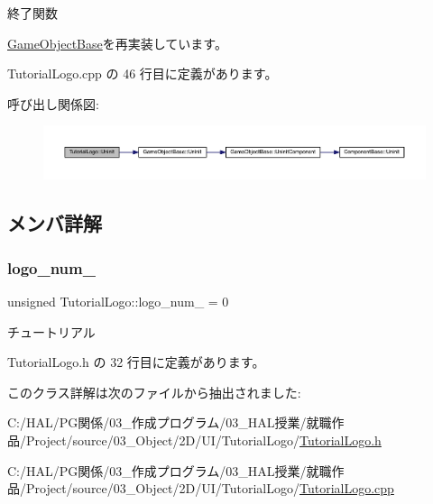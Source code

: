 終了関数 



\mbox{\hyperlink{class_game_object_base_a97e1bc277d7b1c0156d4735de29a022c}{Game\+Object\+Base}}を再実装しています。



 Tutorial\+Logo.\+cpp の 46 行目に定義があります。

呼び出し関係図\+:\nopagebreak
\begin{figure}[H]
\begin{center}
\leavevmode
\includegraphics[width=350pt]{class_tutorial_logo_a8e1f1dba47dadf7d1bb40f616324ffb5_cgraph}
\end{center}
\end{figure}


\subsection{メンバ詳解}
\mbox{\label{class_tutorial_logo_a8027b42e33a036e88277c4cd17fabdaa}} 
\subsubsection{\texorpdfstring{logo\+\_\+num\+\_\+}{logo\_num\_}}
{\footnotesize\ttfamily unsigned Tutorial\+Logo\+::logo\+\_\+num\+\_\+ = 0\hspace{0.3cm}{\ttfamily [private]}}



チュートリアル 



 Tutorial\+Logo.\+h の 32 行目に定義があります。



このクラス詳解は次のファイルから抽出されました\+:\begin{DoxyCompactItemize}
\item 
C\+:/\+H\+A\+L/\+P\+G関係/03\+\_\+作成プログラム/03\+\_\+\+H\+A\+L授業/就職作品/\+Project/source/03\+\_\+\+Object/2\+D/\+U\+I/\+Tutorial\+Logo/\mbox{\hyperlink{_tutorial_logo_8h}{Tutorial\+Logo.\+h}}\item 
C\+:/\+H\+A\+L/\+P\+G関係/03\+\_\+作成プログラム/03\+\_\+\+H\+A\+L授業/就職作品/\+Project/source/03\+\_\+\+Object/2\+D/\+U\+I/\+Tutorial\+Logo/\mbox{\hyperlink{_tutorial_logo_8cpp}{Tutorial\+Logo.\+cpp}}\end{DoxyCompactItemize}
